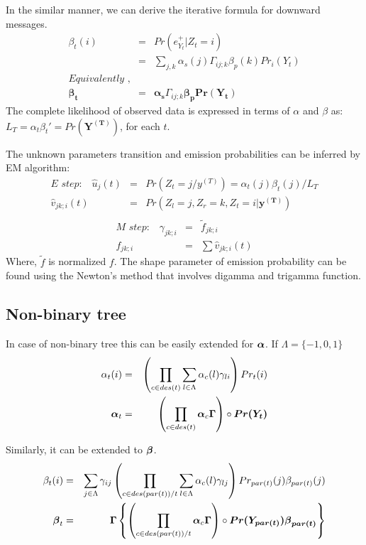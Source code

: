 \documentclass{article}
\begin{document}
In the similar manner, we can derive the iterative formula for downward messages. 
\begin{eqnarray}
	\beta_t(i) &=& Pr(e_{Y_t}^+ |Z_t=i) \nonumber\\
	 &=& \sum_{j,k} \alpha_{s}(j) \Gamma_{ij;k} \beta_{p}(k) Pr_i(Y_t) \nonumber\\ 
	 \textit{Equivalently },  \nonumber\\
	 \boldsymbol{\beta_t} &=&   \boldsymbol{\alpha_{s}} \Gamma_{ij;k}  \boldsymbol{\beta_{p} Pr(Y_t)} 
\end{eqnarray}
The complete likelihood of observed data is expressed in terms of $\alpha$ and $\beta$ as:
$ L_T= \alpha_t \beta_t' = Pr(\boldsymbol{Y^{(T)}} )$, for each $t$.   

The unknown parameters transition and emission probabilities can be inferred by EM algorithm:
\begin{eqnarray*}
	\textit{E step:} \quad
	\hat{u}_j(t) &=&  Pr(Z_t =  j/y^{(T)}) = \alpha_t(j) \beta_t(j) /L_T  \\
	\hat{v}_{jk;i}(t) &=&  Pr(Z_{l} = j, Z_{r} = k,  Z_{t} = i | \boldsymbol{y^{(T)}}) \\
\end{eqnarray*}
\begin{eqnarray*}
	  \textit{M step:} \quad
	  \gamma_{jk;i} &=&\tilde{f}_{jk;i} \\
	  f_{jk;i} &=& \sum \hat{v}_{jk;i}(t)
\end{eqnarray*}
Where, $\tilde{f}$ is normalized $f$. The shape parameter of emission probability can be found using the Newton's method that 
involves digamma and trigamma function.

\subsection{Non-binary tree}
In case of non-binary tree this can be easily extended for $\boldsymbol{\alpha}$. If $ \Lambda = \{-1,0,1\}$\\
\begin{eqnarray}
    \alpha_t(i)&=&  \left(  \prod_{c\in des(t)} \sum_{l \in \Lambda} \alpha_c(l) \gamma_{li}  \right)Pr_t(i)\\
    \boldsymbol{\alpha}_t &=& \left(  \prod_{c\in des(t)} \boldsymbol{\alpha}_c \boldsymbol{\Gamma} \right)\circ \boldsymbol{Pr(Y_t)}
\end{eqnarray}

Similarly, it can be extended to $\boldsymbol{\beta}$. 
\begin{eqnarray}
    \beta_t(i)&=& \sum_{j \in \Lambda } \gamma_{ij}\left(  \prod_{c\in des(par(t))/t} \sum_{l \in \Lambda} \alpha_c(l) \gamma_{lj}  \right)  
    Pr_{par(t)}(j)\beta_{par(t)}(j)  \nonumber\\
    \boldsymbol{\beta}_t &=& \boldsymbol{\Gamma}\left\{  \left(  \prod_{c\in des(par(t))/t} \boldsymbol{\alpha}_c \boldsymbol{\Gamma} \right)  \circ  \boldsymbol{Pr(Y_{par(t)}) \boldsymbol{\beta}_{par(t)}}\right\}
\end{eqnarray}
\end{document}
